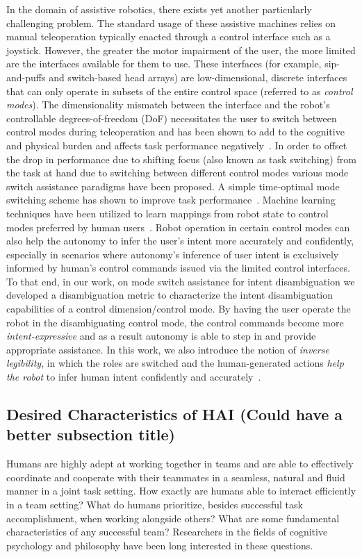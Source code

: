 \documentclass[12pt]{article}
\begin{document}
In the domain of assistive robotics, there exists yet another particularly challenging problem. The standard usage of these assistive machines relies on manual teleoperation typically enacted through a control interface such as a joystick. However, the greater the motor impairment of the user, the more limited are the interfaces available for them to use. These interfaces (for example, sip-and-puffs and switch-based head arrays) are low-dimensional, discrete interfaces that can only operate in subsets of the entire control space (referred to as \textit{control modes}). The dimensionality mismatch between the interface and the robot's controllable degrees-of-freedom (DoF) necessitates the user to switch between control modes during teleoperation and has been shown to add to the cognitive and physical burden and affects task performance negatively~\cite{pilarski2012dynamic}.
In order to offset the drop in performance due to shifting focus (also known as task switching) from the task at hand due to switching between different control modes various mode switch assistance paradigms have been proposed. A simple time-optimal mode switching scheme has shown to improve task performance~\cite{herlant2016assistive}. Machine learning techniques have been utilized to learn mappings from robot state to control modes preferred by human users~\cite{jainrobot}. Robot operation in certain control modes can also help the autonomy to infer the user's intent more accurately and confidently, especially in scenarios where autonomy's inference of user intent is exclusively informed by human's control commands issued via the limited control interfaces. To that end, in our work, on mode switch assistance for intent disambiguation we developed a disambiguation metric to characterize the intent disambiguation capabilities of a control dimension/control mode. By having the user operate the robot in the disambiguating control mode, the control commands become more \textit{intent-expressive} and as a result autonomy is able to step in and provide appropriate assistance. In this work, we also introduce the notion of \textit{inverse legibility}, in which the roles are switched and the human-generated actions \textit{help the robot} to infer human intent confidently and accurately~\cite{gopinath2017mode}. 

\subsection{Desired Characteristics of HAI (Could have a better subsection title)}
Humans are highly adept at working together in teams and are able to effectively coordinate and cooperate with their teammates in a seamless, natural and fluid manner in a joint task setting. How exactly are humans able to interact efficiently in a team setting?  What do humans prioritize, besides successful task accomplishment, when working alongside others? What are some fundamental characteristics of any successful team? Researchers in the fields of cognitive psychology and  philosophy have been long interested in these questions. 
\end{document}
